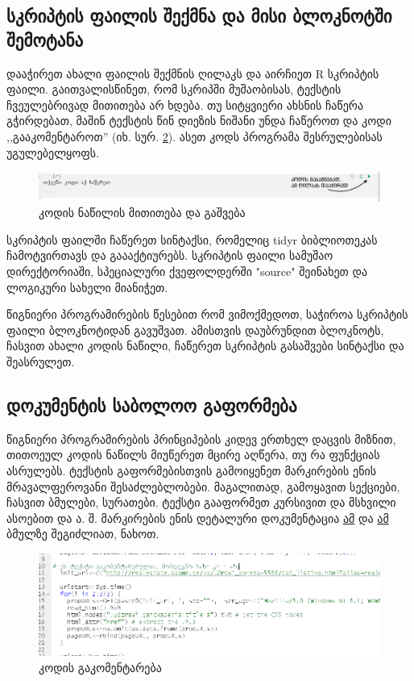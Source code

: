 \documentclass{article}
\begin{document}
\subsection*{ სკრიპტის ფაილის შექმნა და მისი ბლოკნოტში შემოტანა}

დააჭირეთ ახალი ფაილის შექმნის ღილაკს და აირჩიეთ R სკრიპტის ფაილი. გაითვალისწინეთ, რომ სკრიპში მუშაობისას, ტექსტის ჩვეულებრივად მითითება არ ხდება. თუ სიტყვიერი ახსნის ჩაწერა გჭირდებათ, მაშინ ტექსტის წინ დიეზის ნიშანი უნდა ჩაწეროთ და კოდი ,,გააკომენტაროთ'' (იხ. სურ. \ref{comment}). ასეთ კოდს პროგრამა შესრულებისას უგულებელყოფს.

\begin{figure}[h]
\centering
\includegraphics[width=\textwidth]{img/run_chunk.PNG}
\caption{კოდის ნაწილის მითითება და გაშვება}
    \label{chunk}
\end{figure}


სკრიპტის ფაილში ჩაწერეთ სინტაქსი, რომელიც tidyr ბიბლიოთეკას ჩამოტვირთავს და გაააქტიურებს. სკრიპტის ფაილი სამუშაო დირექტორიაში, სპეციალური ქვეფოლდერში "source" შეინახეთ და ლოგიკური სახელი მიანიჭეთ.

წიგნიერი პროგრამირების წესებით რომ ვიმოქმედოთ, საჭიროა სკრიპტის ფაილი ბლოკნოტიდან გავუშვათ. ამისთვის დაუბრუნდით ბლოკნოტს, ჩასვით ახალი კოდის ნაწილი, ჩაწერეთ სკრიპტის გასაშვები სინტაქსი და შეასრულეთ.

\subsection*{დოკუმენტის საბოლოო გაფორმება}

წიგნიერი პროგრამირების პრინციპების კიდევ ერთხელ დაცვის მიზნით, თითოეულ კოდის ნაწილს მიუწერეთ მცირე აღწერა, თუ რა ფუნქციას ასრულებს. ტექსტის გაფორმებისთვის გამოიყენეთ მარკირების ენის მრავალფეროვანი შესაძლებლობები. მაგალითად, გამოყავით სექციები, ჩასვით ბმულები, სურათები. ტექსტი გააფორმეთ კურსივით და მსხვილი ასოებით და ა. შ. მარკირების ენის დეტალური დოკუმენტაცია \href{https://www.rstudio.com/wp-content/uploads/2016/03/rmarkdown-cheatsheet-2.0.pdf}{ამ} და  \href{https://github.com/adam-p/markdown-here/wiki/Markdown-Cheatsheet}{ამ} ბმულზე შეგიძლიათ, ნახოთ.

\begin{figure}[h]
\centering
\includegraphics[width=\textwidth]{img/commented.PNG}
\caption{კოდის გაკომენტარება}
    \label{comment}
\end{figure}
\end{document}
